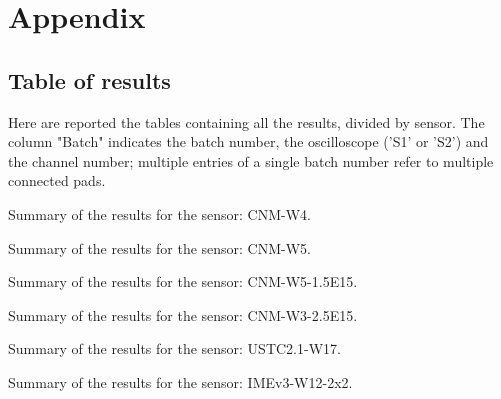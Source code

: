\chapter{Appendix}\label{chap:appendix}

\section{Table of results}

Here are reported the tables containing all the results, divided by sensor. The column "Batch" indicates the batch number, the oscilloscope ('S1' or 'S2') and the channel number; multiple entries of a single batch number refer to multiple connected pads.

\begin{table}[htbp]
    \small
    \centering
    \caption{Summary of the results for the sensor: CNM-W4.}
    \label{tab:results_CNM-W4}
    
\end{table}

\begin{table}[htbp]
    \small
    \centering
    \caption{Summary of the results for the sensor: CNM-W5.}
    \label{tab:results_CNM-W5}
    
\end{table}

\begin{table}[htbp]
    \small
    \centering
    \caption{Summary of the results for the sensor: CNM-W5-1.5E15.}
    \label{tab:results_CNM-W5-1.5E15}
    
\end{table}

\begin{table}[htbp]
    \small
    \centering
    \caption{Summary of the results for the sensor: CNM-W3-2.5E15.}
    \label{tab:results_CNM-W3-2.5E15}
    
\end{table}

\begin{table}[htbp]
    \small
    \centering
    \caption{Summary of the results for the sensor: USTC2.1-W17.}
    \label{tab:results_USTC2.1-W17}
    
\end{table}

\begin{table}[htbp]
    \small
    \centering
    \caption{Summary of the results for the sensor: IMEv3-W12-2x2.}
    \label{tab:results_IMEv3-W12-2x2}
    
\end{table}


